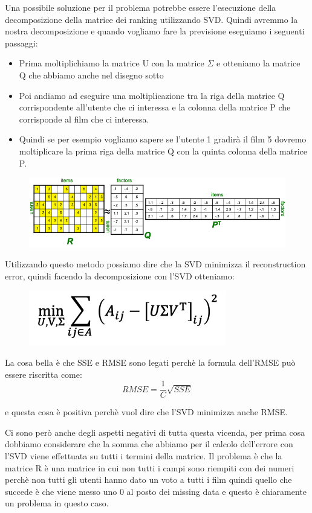 \documentclass[14pt]{extreport}
\begin{document}
Una possibile soluzione per il problema potrebbe essere l'esecuzione della decomposizione della matrice dei ranking utilizzando SVD. Quindi avremmo la
nostra decomposizione e quando vogliamo fare la previsione eseguiamo i seguenti passaggi:
\begin{itemize}
	\item Prima moltiplichiamo la matrice U con la matrice $\Sigma$ e otteniamo la matrice Q che abbiamo anche nel disegno sotto
	\item Poi andiamo ad eseguire una moltiplicazione tra la riga della matrice Q corrispondente all'utente che ci interessa e la colonna della
	matrice P che corrisponde al film che ci interessa.
	\item Quindi se per esempio vogliamo sapere se l'utente 1 gradirà il film 5 dovremo moltiplicare la prima riga della matrice Q con la quinta
	colonna della matrice P.
\end{itemize}

\begin{figure}[H]
	\centering
	\includegraphics[width=0.7\linewidth]{513.jpeg}
\end{figure}


Utilizzando questo metodo possiamo dire che la SVD minimizza il reconstruction error, quindi facendo la decomposizione con l'SVD otteniamo:

\begin{figure}[H]
	\centering
	\includegraphics[width=0.7\linewidth]{514.jpeg}
\end{figure}

La cosa bella è che SSE e RMSE sono legati perchè la formula dell'RMSE può essere riscritta come:
$$RMSE = \frac{1}{C}\sqrt{SSE}$$

e questa cosa è positiva perchè vuol dire che l'SVD minimizza anche RMSE.

Ci sono però anche degli aspetti negativi di tutta questa vicenda, per prima cosa dobbiamo considerare che la somma che abbiamo per il calcolo
dell'errore con l'SVD viene effettuata su tutti i termini della matrice. Il problema è che la matrice R è una matrice in cui non tutti i campi sono
riempiti con dei numeri perchè non tutti gli utenti hanno dato un voto a tutti i film quindi quello che succede è che viene messo uno 0 al posto dei
missing data e questo è chiaramente un problema in questo caso.
\end{document}
